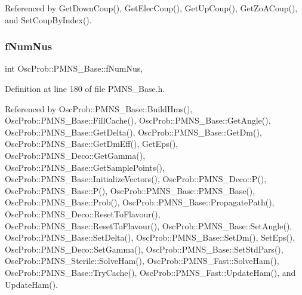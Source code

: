 Referenced by Get\+Down\+Coup(), Get\+Elec\+Coup(), Get\+Up\+Coup(), Get\+Zo\+A\+Coup(), and Set\+Coup\+By\+Index().

\mbox{\label{classOscProb_1_1PMNS__Base_a24bb74bed63569dfe88b18fa6a08060e}} 
\subsubsection{\texorpdfstring{f\+Num\+Nus}{fNumNus}}
{\footnotesize\ttfamily int Osc\+Prob\+::\+P\+M\+N\+S\+\_\+\+Base\+::f\+Num\+Nus\hspace{0.3cm}{\ttfamily [protected]}, {\ttfamily [inherited]}}



Definition at line 180 of file P\+M\+N\+S\+\_\+\+Base.\+h.



Referenced by Osc\+Prob\+::\+P\+M\+N\+S\+\_\+\+Base\+::\+Build\+Hms(), Osc\+Prob\+::\+P\+M\+N\+S\+\_\+\+Base\+::\+Fill\+Cache(), Osc\+Prob\+::\+P\+M\+N\+S\+\_\+\+Base\+::\+Get\+Angle(), Osc\+Prob\+::\+P\+M\+N\+S\+\_\+\+Base\+::\+Get\+Delta(), Osc\+Prob\+::\+P\+M\+N\+S\+\_\+\+Base\+::\+Get\+Dm(), Osc\+Prob\+::\+P\+M\+N\+S\+\_\+\+Base\+::\+Get\+Dm\+Eff(), Get\+Eps(), Osc\+Prob\+::\+P\+M\+N\+S\+\_\+\+Deco\+::\+Get\+Gamma(), Osc\+Prob\+::\+P\+M\+N\+S\+\_\+\+Base\+::\+Get\+Sample\+Points(), Osc\+Prob\+::\+P\+M\+N\+S\+\_\+\+Base\+::\+Initialize\+Vectors(), Osc\+Prob\+::\+P\+M\+N\+S\+\_\+\+Deco\+::\+P(), Osc\+Prob\+::\+P\+M\+N\+S\+\_\+\+Base\+::\+P(), Osc\+Prob\+::\+P\+M\+N\+S\+\_\+\+Base\+::\+P\+M\+N\+S\+\_\+\+Base(), Osc\+Prob\+::\+P\+M\+N\+S\+\_\+\+Base\+::\+Prob(), Osc\+Prob\+::\+P\+M\+N\+S\+\_\+\+Base\+::\+Propagate\+Path(), Osc\+Prob\+::\+P\+M\+N\+S\+\_\+\+Deco\+::\+Reset\+To\+Flavour(), Osc\+Prob\+::\+P\+M\+N\+S\+\_\+\+Base\+::\+Reset\+To\+Flavour(), Osc\+Prob\+::\+P\+M\+N\+S\+\_\+\+Base\+::\+Set\+Angle(), Osc\+Prob\+::\+P\+M\+N\+S\+\_\+\+Base\+::\+Set\+Delta(), Osc\+Prob\+::\+P\+M\+N\+S\+\_\+\+Base\+::\+Set\+Dm(), Set\+Eps(), Osc\+Prob\+::\+P\+M\+N\+S\+\_\+\+Deco\+::\+Set\+Gamma(), Osc\+Prob\+::\+P\+M\+N\+S\+\_\+\+Base\+::\+Set\+Std\+Pars(), Osc\+Prob\+::\+P\+M\+N\+S\+\_\+\+Sterile\+::\+Solve\+Ham(), Osc\+Prob\+::\+P\+M\+N\+S\+\_\+\+Fast\+::\+Solve\+Ham(), Osc\+Prob\+::\+P\+M\+N\+S\+\_\+\+Base\+::\+Try\+Cache(), Osc\+Prob\+::\+P\+M\+N\+S\+\_\+\+Fast\+::\+Update\+Ham(), and Update\+Ham().

